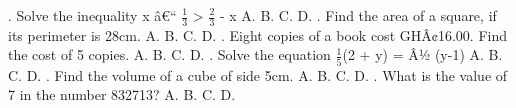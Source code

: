 \documentclass{article}
\begin{document}
\begin{multicols}{2}
 \newline{}. Solve the inequality x â€“ \(\frac{1}{3}\) > \(\frac{2}{3}\) - x \newline \indent A. \newline \indent B. \newline \indent C. \newline \indent D.  \newline{}. Find the area of a square, if its perimeter is 28cm. \newline \indent A. \newline \indent B. \newline \indent C. \newline \indent D.  \newline{}. Eight copies of a book cost GHÂ¢16.00. Find the cost of 5 copies. \newline \indent A. \newline \indent B. \newline \indent C. \newline \indent D.  \newline{}. Solve the equation \(\frac{1}{5}\)(2 + y) = Â½ (y-1) \newline \indent A. \newline \indent B. \newline \indent C. \newline \indent D.  \newline{}.  Find the volume of a cube of side 5cm. \newline \indent A. \newline \indent B. \newline \indent C. \newline \indent D.  \newline{}. What is the value of 7 in the number 832713? \newline \indent A. \newline \indent B. \newline \indent C. \newline \indent D.  \newline\newline 
\end{multicols}
\end{document}
